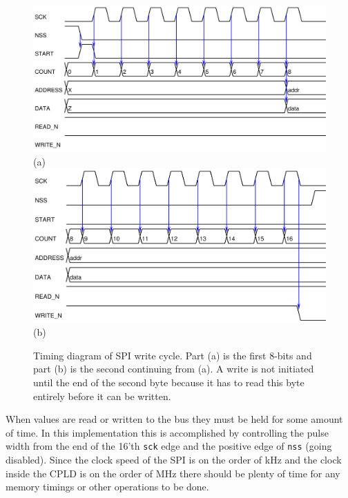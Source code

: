 \documentclass{article}
\begin{document}
\begin{figure}
\center
\includegraphics[scale=0.7]{figure/spi_ctl-timing/write-byte1} \\
(a) \\
\includegraphics[scale=0.7]{figure/spi_ctl-timing/write-byte2} \\
(b)
\caption{Timing diagram of SPI write cycle.
Part (a) is the first 8-bits and part (b) is the second
continuing from (a).
A write is not initiated until the end of the
second byte because it has to read this byte entirely before it can be written.}
\label{fig:spi_write}
\end{figure}

When values are read or written to the bus they must be held for
some amount of time.
In this implementation this is accomplished by controlling the
pulse width from the end of the 16'th \verb+sck+ edge and the positive
edge of \verb+nss+ (going disabled).
Since the clock speed of the SPI is on the order of kHz and the
clock inside the CPLD is on the order of MHz there should be plenty
of time for any memory timings or other operations to be done.

\clearpage

\end{document}
